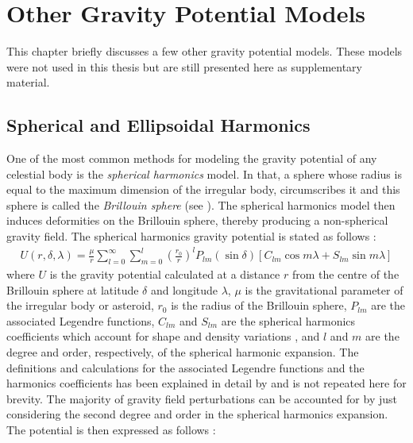 \chapter{Other Gravity Potential Models}
\label{chap:other_gravity_potential_models}
\graphicspath{{Modeling/Images/}}

This chapter briefly discusses a few other gravity potential models. These models were not used in this thesis but are still presented here as supplementary material.

\section{Spherical and Ellipsoidal Harmonics}
\label{subsec:spherical_ellipsoidal_harmonics}
One of the most common methods for modeling the gravity potential of any celestial body is the \textit{spherical harmonics} model. In that, a sphere whose radius is equal to the maximum dimension of the irregular body, circumscribes it and this sphere is called the \textit{Brillouin sphere} (see ). The spherical harmonics model then induces deformities on the Brillouin sphere, thereby producing a non-spherical gravity field. The spherical harmonics gravity potential is stated as follows \parencite{scheeresBook}:
\begin{align}
    U(r, \delta, \lambda) = \frac{\mu}{r} \sum_{l=0}^{\infty} \sum_{m=0}^{l} \left(\frac{r_0}{r}\right)^l P_{lm} (\sin\delta) [C_{lm}\cos m\lambda + S_{lm}\sin m\lambda]
    \label{eqn:spherical_harmonics_general}
\end{align}
where $U$ is the gravity potential calculated at a distance $r$ from the centre of the Brillouin sphere at latitude $\delta$ and longitude $\lambda$, $\mu$ is the gravitational parameter of the irregular body or asteroid, $r_0$ is the radius of the Brillouin sphere, $P_{lm}$ are the associated Legendre functions, $C_{lm}$ and $S_{lm}$ are the spherical harmonics coefficients which account for shape and density variations \parencite{romain2001ellipsoidal}, and $l$ and $m$ are the degree and order, respectively, of the spherical harmonic expansion. The definitions and calculations for the associated Legendre functions and the harmonics coefficients has been explained in detail by \cite{scheeresBook} and is not repeated here for brevity. The majority of gravity field perturbations can be accounted for by just considering the second degree and order in the spherical harmonics expansion. The potential is then expressed as follows \parencite{scheeresBook}:
